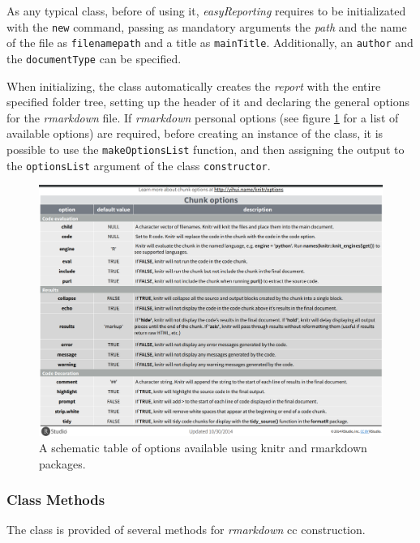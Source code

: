 As any typical class, before of using it, \textit{easyReporting} requires to be initializated with the \lstinline!new! command, passing as mandatory arguments the \textit{path} and the name of the file as \lstinline!filenamepath! and a title as \lstinline!mainTitle!.
Additionally, an \lstinline!author! and the \lstinline!documentType! can be specified.

When initializing, the class automatically creates the \textit{report} with the entire specified folder tree, setting up the header of it and declaring the general options for the \textit{rmarkdown} file.
If \textit{rmarkdown} personal options (see figure \ref{fig:knitropts} for a list of available options) are required, before creating an instance of the class, it is possible to use the \lstinline!makeOptionsList! function, and then assigning the output to the \lstinline!optionsList! argument of the class \lstinline!constructor!.

\begin{figure}[H]
\centering
\includegraphics[width=\textwidth, keepaspectratio]{img/rr/knitropts.png}
\caption[knitr options]{A schematic table of options available using knitr and rmarkdown packages.}
\label{fig:knitropts}
\end{figure}



\subsubsection{Class Methods}

The class is provided of several methods for \textit{rmarkdown} \gls{cc} construction.

